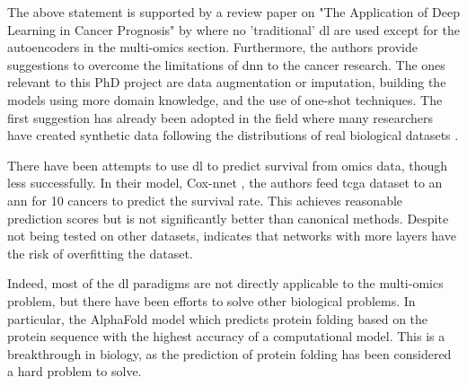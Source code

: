 The above statement is supported by a review paper on "The Application of Deep Learning in Cancer Prognosis" by \citet{Zhu2020-cv} where no 'traditional' \acrshort{dl} are used except for the autoencoders in the multi-omics section. Furthermore, the authors provide suggestions to overcome the limitations of \acrshort{dnn} to the cancer research. The ones relevant to this PhD project are data augmentation or imputation, building the models using more domain knowledge, and the use of one-shot techniques. The first suggestion has already been adopted in the field where many researchers have created synthetic data following the distributions of real biological datasets \citep{Zhao2012-wj,Leiserson2015-yk}.

There have been attempts to use \acrshort{dl} to predict survival from omics data, though less successfully. In their model, Cox-nnet \citep{Ching2018-gq}, the authors feed \acrshort{tcga} dataset to an \acrshort{ann} for 10 cancers to predict the survival rate. This achieves reasonable prediction scores but is not significantly better than canonical methods. Despite not being tested on other datasets, \citet{Ching2018-gq} indicates that networks with more layers have the risk of overfitting the dataset.  

Indeed, most of the \acrshort{dl} paradigms are not directly applicable to the multi-omics problem, but there have been efforts to solve other biological problems. In particular, the AlphaFold model \citep{Jumper2021-du} which predicts protein folding based on the protein sequence with the highest accuracy of a computational model. This is a breakthrough in biology, as the prediction of protein folding has been considered a hard problem to solve.



